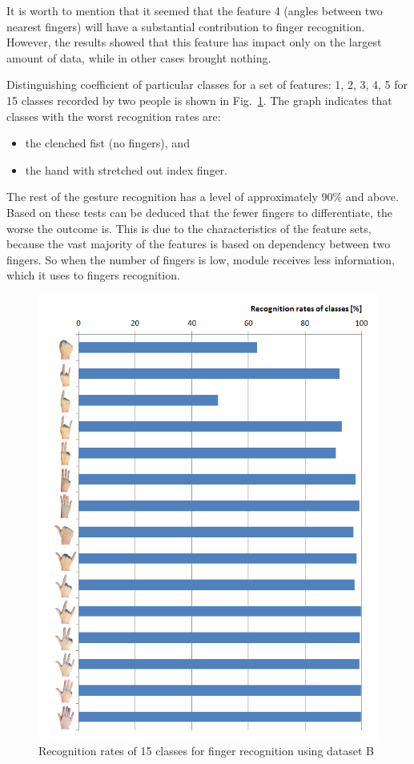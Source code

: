 It is worth to mention that it seemed that the feature 4 (angles between two nearest fingers) will have a substantial contribution to finger recognition. However, the results showed that this feature has impact only on the largest amount of data, while in other cases brought nothing.

Distinguishing coefficient of particular classes for a set of features: 1, 2, 3, 4, 5 for 15 classes recorded by two people is shown in Fig.~\ref{classRateFD}.
The graph indicates that classes with the worst recognition rates are:
\begin{itemize}
\item the clenched fist (no fingers), and
\item the hand with stretched out index finger.
\end{itemize}
The rest of the gesture recognition has a level of approximately 90\% and above. Based on these tests can be deduced that the fewer fingers to differentiate, the worse the outcome is. This is due to the characteristics of the feature sets, because the vast majority of the features is based on dependency between two fingers. So when the number of fingers is low, module receives less information, which it uses to fingers recognition.

\begin{figure}[htb]
\centering
 \includegraphics[width=0.75\columnwidth]{figures/classRateFD.png}
 \caption{Recognition rates of 15 classes for finger recognition using dataset B}
 \label{classRateFD}
\end{figure}

